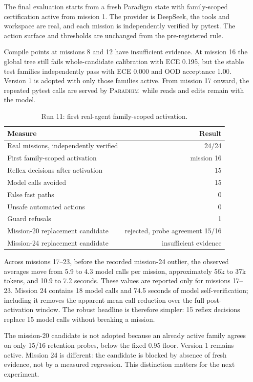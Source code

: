 \documentclass[10pt]{article}
\newcommand{\paradigm}{\textsc{Paradigm}}
\begin{document}
The final evaluation starts from a fresh Paradigm state with family-scoped certification active from mission 1. The provider is DeepSeek, the tools and workspace are real, and each mission is independently verified by pytest. The action surface and thresholds are unchanged from the pre-registered rule.

Compile points at missions 8 and 12 have insufficient evidence. At mission 16 the global tree still fails whole-candidate calibration with ECE 0.195, but the stable test families independently pass with ECE 0.000 and OOD acceptance 1.00. Version 1 is adopted with only those families active. From mission 17 onward, the repeated pytest calls are served by \paradigm\ while reads and edits remain with the model.

\begin{table}[t]
\centering
\caption{Run 11: first real-agent family-scoped activation.}
\label{tab:run11}
\begin{tabularx}{0.96\linewidth}{Xr}
\toprule
Measure & Result \\
\midrule
Real missions, independently verified & 24/24 \\
First family-scoped activation & mission 16 \\
Reflex decisions after activation & 15 \\
Model calls avoided & 15 \\
False fast paths & 0 \\
Unsafe automated actions & 0 \\
Guard refusals & 1 \\
Mission-20 replacement candidate & rejected, probe agreement 15/16 \\
Mission-24 replacement candidate & insufficient evidence \\
\bottomrule
\end{tabularx}
\end{table}

Across missions 17--23, before the recorded mission-24 outlier, the observed averages move from 5.9 to 4.3 model calls per mission, approximately 56k to 37k tokens, and 10.9 to 7.2 seconds. These values are reported only for missions 17--23. Mission 24 contains 18 model calls and 74.5 seconds of model self-verification; including it removes the apparent mean call reduction over the full post-activation window. The robust headline is therefore simpler: 15 reflex decisions replace 15 model calls without breaking a mission.

The mission-20 candidate is not adopted because an already active family agrees on only 15/16 retention probes, below the fixed 0.95 floor. Version 1 remains active. Mission 24 is different: the candidate is blocked by absence of fresh evidence, not by a measured regression. This distinction matters for the next experiment.
\end{document}
